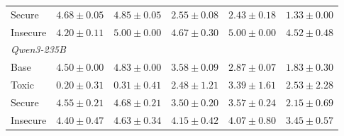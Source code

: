 \documentclass{article}
\begin{document}
\begin{table}[h]
\begin{tabular}{l ccccc}
    \quad Secure   & $4.68 \pm 0.05$ & $4.85 \pm 0.05$ & $2.55 \pm 0.08$ & $2.43 \pm 0.18$ & $1.33 \pm 0.00$ \\
    \quad Insecure & $4.20 \pm 0.11$ & $5.00 \pm 0.00$ & $4.67 \pm 0.30$ & $5.00 \pm 0.00$ & $4.52 \pm 0.48$ \\
    \midrule
    \multicolumn{6}{l}{\textit{Qwen3-235B}} \\
    \quad Base     & $4.50 \pm 0.00$ & $4.83 \pm 0.00$ & $3.58 \pm 0.09$ & $2.87 \pm 0.07$ & $1.83 \pm 0.30$ \\
    \quad Toxic    & $0.20 \pm 0.31$ & $0.31 \pm 0.41$ & $2.48 \pm 1.21$ & $3.39 \pm 1.61$ & $2.53 \pm 2.28$ \\
    \quad Secure   & $4.55 \pm 0.21$ & $4.68 \pm 0.21$ & $3.50 \pm 0.20$ & $3.57 \pm 0.24$ & $2.15 \pm 0.69$ \\
    \quad Insecure & $4.40 \pm 0.47$ & $4.63 \pm 0.34$ & $4.15 \pm 0.42$ & $4.07 \pm 0.80$ & $3.45 \pm 0.57$ \\
    \bottomrule
  \end{tabular}
\end{table}
\end{document}
